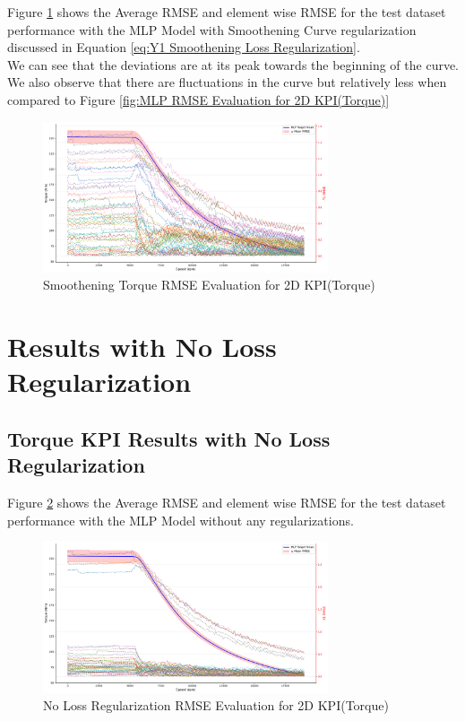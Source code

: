 \documentclass{report} %
\begin{document}
Figure \ref{fig:Smoothening Torque RMSE Evaluation for 2D KPI(Torque)} shows the Average \ac{RMSE} and element wise \ac{RMSE} for the test dataset performance with the MLP Model with Smoothening Curve regularization discussed in Equation \ref{eq:Y1 Smoothening Loss Regularization}.\\
We can see that the deviations are at its peak towards the beginning of the curve. 
We also observe that there are fluctuations in the curve but relatively less when compared to Figure \ref{fig:MLP RMSE Evaluation for 2D KPI(Torque)}\\
\begin{figure}[H]
    \centering
    \includegraphics[width=0.75\textwidth]{./ReportImages/RMSE_MLP_Smoothening_y1.png} 
    \caption{Smoothening Torque \ac{RMSE} Evaluation for 2D KPI(Torque)} 
    \label{fig:Smoothening Torque RMSE Evaluation for 2D KPI(Torque)}
\end{figure}

\section{Results with No Loss Regularization}\label{sec:Results with No Loss Regularization}

\subsection{Torque \ac{KPI} Results with No Loss Regularization}\label{subsec:2D Torque Results with No Loss Regularization}

Figure \ref{fig:No Loss Regularization RMSE Evaluation for 2D KPI(Torque)} shows the Average \ac{RMSE} and element wise \ac{RMSE} for the test dataset performance with the MLP Model without any regularizations.\\

\begin{figure}[H]
    \centering
    \includegraphics[width=0.75\textwidth]{./ReportImages/RMSE_MLP_no_lossreg_y1.png} 
    \caption{No Loss Regularization \ac{RMSE} Evaluation for 2D KPI(Torque)} 
    \label{fig:No Loss Regularization RMSE Evaluation for 2D KPI(Torque)}
\end{figure}
\end{document}
